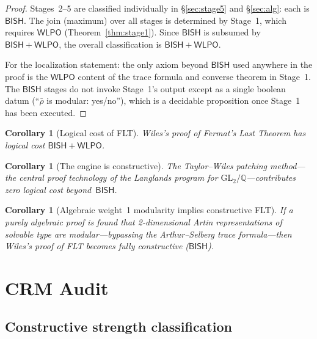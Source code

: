 \documentclass[11pt]{article}
\theoremstyle{plain}
\newtheorem{corollary}[theorem]{Corollary}
\theoremstyle{definition}
\theoremstyle{remark}
\newcommand{\Q}{\mathbb{Q}}
\newcommand{\GL}{\mathrm{GL}}
\newcommand{\BISH}{\mathsf{BISH}}
\newcommand{\WLPO}{\mathsf{WLPO}}
\begin{document}
\begin{proof}
Stages~2--5 are classified individually in
\S\ref{sec:stage5} and \S\ref{sec:alg}: each is $\BISH$.  The
join (maximum) over all stages is determined by Stage~1, which
requires $\WLPO$ (Theorem~\ref{thm:stage1}).  Since $\BISH$ is
subsumed by $\BISH + \WLPO$, the overall classification is
$\BISH + \WLPO$.

For the localization statement: the only axiom beyond $\BISH$
used anywhere in the proof is the $\WLPO$ content of the trace
formula and converse theorem in Stage~1.  The $\BISH$ stages do
not invoke Stage~1's output except as a single boolean datum
(``$\bar{\rho}$ is modular: yes/no''), which is a decidable
proposition once Stage~1 has been executed.
\end{proof}

\begin{corollary}[Logical cost of FLT]\label{cor:flt}
Wiles's proof of Fermat's Last Theorem has logical cost
$\BISH + \WLPO$.
\end{corollary}

\begin{corollary}[The engine is constructive]\label{cor:engine}
The Taylor--Wiles patching method---the central proof technology
of the Langlands program for $\GL_2/\Q$---contributes zero
logical cost beyond~$\BISH$.
\end{corollary}

\begin{corollary}[Algebraic weight~1 modularity implies
  constructive FLT]\label{cor:alg}
If a purely algebraic proof is found that 2-dimensional Artin
representations of solvable type are modular---bypassing the
Arthur--Selberg trace formula---then Wiles's proof of FLT
becomes fully constructive ($\BISH$).
\end{corollary}


\section{CRM Audit}\label{sec:crm}

\subsection{Constructive strength classification}
\end{document}
